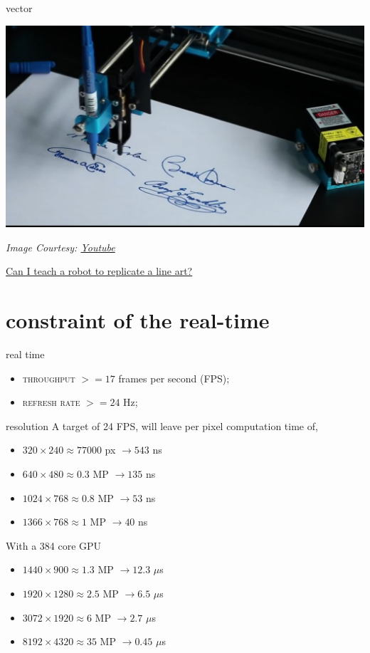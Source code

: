 \documentclass[aspectratio=169,xcolor={dvipsnames,svgnames}]{beamer}
\begin{document}
\begin{frame}[label={sec:orgb4d50ee}]{vector}
\centering

\begin{center}
\includegraphics[width=0.6\linewidth]{images/plotter.jpg}
\end{center}
\emph{Image Courtesy: \href{https://i.ytimg.com/vi/3ohDaX4uxKY/maxresdefault.jpg}{Youtube}}

\href{https://youtu.be/nMt5Dw04XhY}{Can I teach a robot to replicate a line art?}
\cite{VKN20}
\end{frame}

\section{constraint of the real-time}
\label{sec:org9ed48d7}

\begin{frame}[label={sec:orgfe44151}]{real time}
\begin{itemize}
\item \alert{\textsc{throughput}} \(>=17\) frames per second (FPS);
\item \alert{\textsc{refresh rate}} \(>=24\) Hz;
\end{itemize}
\end{frame}

\begin{frame}[label={sec:org28e6aa7}]{resolution}
A target of 24 FPS, will leave per pixel computation
time of,

\begin{itemize}
\item \(320\times240\approx77000\) px \(\to 543\) ns
\item \(640\times480\approx0.3\) MP \(\to 135\) ns
\item \(1024\times768\approx0.8\) MP \(\to 53\) ns
\item \(1366\times768\approx1\) MP \(\to 40\) ns
\end{itemize}

\pause

With a 384 core GPU

\begin{itemize}
\item \(1440\times900\approx1.3\) MP \(\to 12.3\) \(\mu\)s
\item \(1920\times1280\approx2.5\) MP \(\to 6.5\) \(\mu\)s
\item \(3072\times1920\approx6\) MP \(\to 2.7\) \(\mu\)s
\item \(8192\times4320\approx35\) MP \(\to 0.45\) \(\mu\)s
\end{itemize}
\end{frame}
\end{document}
